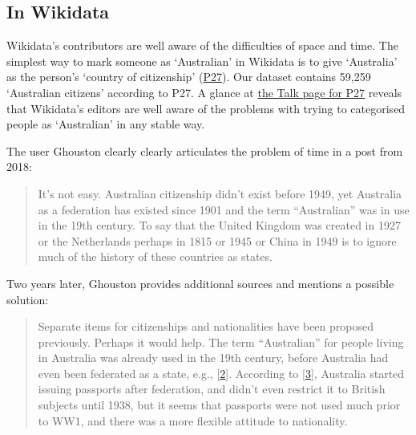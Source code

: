 \documentclass[
  a4paper,
  DIV=11,
  numbers=noendperiod]{scrreprt}
\begin{document}
\hypertarget{in-wikidata}{%
\subsection{In Wikidata}\label{in-wikidata}}

Wikidata's contributors are well aware of the difficulties of space and
time. The simplest way to mark someone as `Australian' in Wikidata is to
give `Australia' as the person's `country of citizenship'
(\href{https://www.wikidata.org/wiki/Property:P27}{P27}). Our dataset
contains 59,259 `Australian citizens' according to P27. A glance at
\href{https://www.wikidata.org/wiki/Property_talk:P27}{the Talk page for
P27} reveals that Wikidata's editors are well aware of the problems with
trying to categorised people as `Australian' in any stable way.

The user Ghouston clearly clearly articulates the problem of time in a
post from 2018:

\begin{quote}
It's not easy. Australian citizenship didn't exist before 1949, yet
Australia as a federation has existed since 1901 and the term
``Australian'' was in use in the 19th century. To say that the United
Kingdom was created in 1927 or the Netherlands perhaps in 1815 or 1945
or China in 1949 is to ignore much of the history of these countries as
states.
\end{quote}

Two years later, Ghouston provides additional sources and mentions a
possible solution:

\begin{quote}
Separate items for citizenships and nationalities have been proposed
previously. Perhaps it would help. The term ``Australian'' for people
living in Australia was already used in the 19th century, before
Australia had even been federated as a state, e.g.,
{[}\href{https://trove.nla.gov.au/newspaper/article/197054485}{2}{]}.
According to
{[}\href{https://www.passport-collector.com/evolution-australian-passport/}{3}{]},
Australia started issuing passports after federation, and didn't even
restrict it to British subjects until 1938, but it seems that passports
were not used much prior to WW1, and there was a more flexible attitude
to nationality.
\end{quote}
\end{document}
